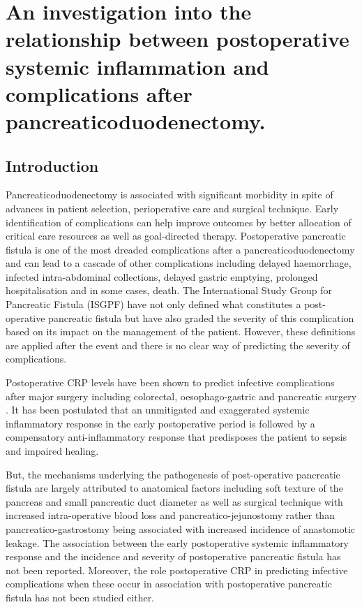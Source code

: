 
\chapter{An investigation into the relationship between postoperative systemic inflammation and complications after pancreaticoduodenectomy.}
\label{ch_crp_comp}


\clearpage
\section{Introduction}
Pancreaticoduodenectomy is associated with significant morbidity in spite of advances in patient selection, perioperative care and surgical technique. Early identification of complications can help improve outcomes by better allocation of critical care resources as well as goal-directed therapy. Postoperative pancreatic fistula is one of the most dreaded complications after a pancreaticoduodenectomy and can lead to a cascade of other complications including delayed haemorrhage, infected intra-abdominal collections, delayed gastric emptying, prolonged hospitalisation and in some cases, death. The International Study Group for Pancreatic Fistula (ISGPF) have not only defined what constitutes a post-operative pancreatic fistula but have also graded the severity of this complication based on its impact on the management of the patient. However, these definitions are applied after the event and there is no clear way of predicting the severity of complications.

Postoperative CRP levels have been shown to predict infective complications after major surgery including colorectal,  oesophago-gastric and pancreatic surgery \parencite{mustard_c-reactive_1987, matthiessen_increase_2008, mcneer_early_2010, dutta_persistent_2011, mackay_c-reactive_2011, murakami_soft_2008, welsch_persisting_2008}. It has been postulated that an unmitigated and exaggerated systemic inflammatory response in the early postoperative period is followed by a compensatory anti-inflammatory response that predisposes the patient to sepsis and impaired healing. 

But, the mechanisms underlying the pathogenesis of post-operative pancreatic fistula are largely attributed to anatomical factors including soft texture of the pancreas and small pancreatic duct diameter as well as surgical technique with increased intra-operative blood loss and pancreatico-jejunostomy rather than pancreatico-gastrostomy being associated with increased incidence of anastomotic leakage. The association between the early postoperative systemic inflammatory response and the incidence and severity of postoperative pancreatic fistula has not been reported. Moreover, the role postoperative CRP in predicting infective complications when these occur in association with postoperative pancreatic fistula has not been studied either. 

